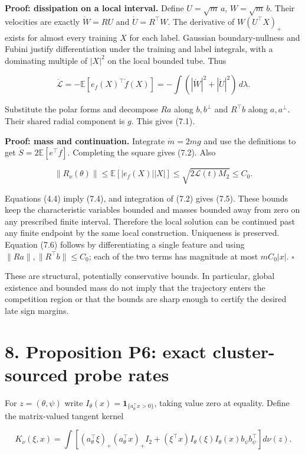 \documentclass[
  10pt,
]{article}
\begin{document}
\textbf{Proof: dissipation on a local interval.} Define
\(U=\sqrt m\,a\), \(W=\sqrt m\,b\). Their velocities are exactly
\(\dot W=RU\) and \(\dot U=R^\top W\). The derivative of
\(W(U^\top X)_+\) exists for almost every training \(X\) for each label.
Gaussian boundary-nullness and Fubini justify differentiation under the
training and label integrals, with a dominating multiple of \(|X|^2\) on
the local bounded tube. Thus

\[
 \dot{\mathcal L}
 =-\mathbb E[e_f(X)^\top\dot f(X)]
 =-\int (|\dot W|^2+|\dot U|^2)\,d\lambda.
\]

Substitute the polar forms and decompose \(Ra\) along \(b,b^\perp\) and
\(R^\top b\) along \(a,a^\perp\). Their shared radial component is
\(g\). This gives (7.1).

\textbf{Proof: mass and continuation.} Integrate \(\dot m=2mg\) and use
the definitions to get \(\dot S=2\mathbb E[e^\top f]\). Completing the
square gives (7.2). Also

\[
 \|R_\nu(\theta)\|
 \le\mathbb E[|e_f(X)||X|]
 \le\sqrt{2\mathcal L(t)M_2}\le C_0.
\]

Equations (4.4) imply (7.4), and integration of (7.2) gives (7.5). These
bounds keep the characteristic variables bounded and masses bounded away
from zero on any prescribed finite interval. Therefore the local
solution can be continued past any finite endpoint by the same local
construction. Uniqueness is preserved. Equation (7.6) follows by
differentiating a single feature and using
\(\|Ra\|,\|R^\top b\|\le C_0\); each of the two terms has magnitude at
most \(mC_0|x|\). \(\square\)

These are structural, potentially conservative bounds. In particular,
global existence and bounded mass do not imply that the trajectory
enters the competition region or that the bounds are sharp enough to
certify the desired late sign margins.

\section{8. Proposition P6: exact cluster-sourced probe
rates}\label{proposition-p6-exact-cluster-sourced-probe-rates}

For \(z=(\theta,\psi)\) write
\(I_\theta(x)=\mathbf1_{\{a_\theta^\top x>0\}}\), taking value zero at
equality. Define the matrix-valued tangent kernel

\[
 K_\nu(\xi,x)=\int\left[
 (a_\theta^\top\xi)_+(a_\theta^\top x)_+I_2
 +(\xi^\top x)I_\theta(\xi)I_\theta(x)b_\psi b_\psi^\top
 \right]d\nu(z).
 \tag{8.1}
\]
\end{document}
